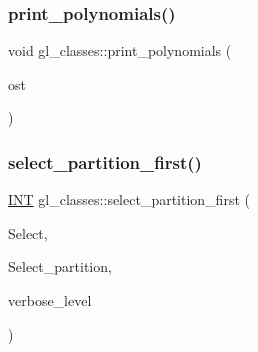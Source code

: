\mbox{\label{classgl__classes_a7196364aa945ad33ddf36f1b031bba16}} 
\subsubsection{\texorpdfstring{print\+\_\+polynomials()}{print\_polynomials()}}
{\footnotesize\ttfamily void gl\+\_\+classes\+::print\+\_\+polynomials (\begin{DoxyParamCaption}\item[{ofstream \&}]{ost }\end{DoxyParamCaption})}

\mbox{\label{classgl__classes_a511118c4aa43095abc3c4e903cdca973}} 
\subsubsection{\texorpdfstring{select\+\_\+partition\+\_\+first()}{select\_partition\_first()}}
{\footnotesize\ttfamily \mbox{\hyperlink{galois_8h_a09fddde158a3a20bd2dcadb609de11dc}{I\+NT}} gl\+\_\+classes\+::select\+\_\+partition\+\_\+first (\begin{DoxyParamCaption}\item[{\mbox{\hyperlink{galois_8h_a09fddde158a3a20bd2dcadb609de11dc}{I\+NT}} $\ast$}]{Select,  }\item[{\mbox{\hyperlink{galois_8h_a09fddde158a3a20bd2dcadb609de11dc}{I\+NT}} $\ast$}]{Select\+\_\+partition,  }\item[{\mbox{\hyperlink{galois_8h_a09fddde158a3a20bd2dcadb609de11dc}{I\+NT}}}]{verbose\+\_\+level }\end{DoxyParamCaption})}

\mbox{\label{classgl__classes_a5c5dd7feacc31e5d5fef2f68e11ccaaf}} 
